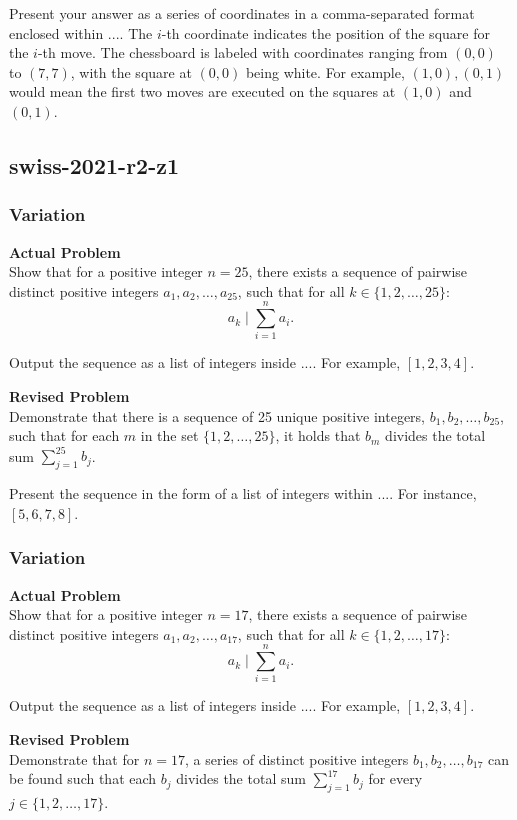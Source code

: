 Present your answer as a series of coordinates in a comma-separated format enclosed within $\boxed{...}$. The $i$-th coordinate indicates the position of the square for the $i$-th move. The chessboard is labeled with coordinates ranging from $(0,0)$ to $(7,7)$, with the square at $(0,0)$ being white. For example, $\boxed{(1,0),(0,1)}$ would mean the first two moves are executed on the squares at $(1,0)$ and $(0,1)$.

\subsection{swiss-2021-r2-z1}
\subsubsection{Variation}
\textbf{Actual Problem}\\
Show that for a positive integer $n=25$, there exists a sequence of pairwise distinct positive integers $a_1, a_2, \ldots, a_{25}$, such that for all $k \in \{1,2,\ldots,25\}$: $$a_k \mid \sum_{i=1}^{n} a_i.$$

Output the sequence as a list of integers inside $\boxed{...}$. For example, $\boxed{[1,2,3,4]}$.

\textbf{Revised Problem}\\
Demonstrate that there is a sequence of 25 unique positive integers, $b_1, b_2, \ldots, b_{25}$, such that for each $m$ in the set $\{1, 2, \ldots, 25\}$, it holds that $b_m$ divides the total sum $\sum_{j=1}^{25} b_j$.

Present the sequence in the form of a list of integers within $\boxed{...}$. For instance, $\boxed{[5,6,7,8]}$.

\subsubsection{Variation}
\textbf{Actual Problem}\\
Show that for a positive integer $n=17$, there exists a sequence of pairwise distinct positive integers $a_1, a_2, \ldots, a_{17}$, such that for all $k \in \{1,2,\ldots,17\}$: $$a_k \mid \sum_{i=1}^{n} a_i.$$

Output the sequence as a list of integers inside $\boxed{...}$. For example, $\boxed{[1,2,3,4]}$.

\textbf{Revised Problem}\\
Demonstrate that for $n=17$, a series of distinct positive integers $b_1, b_2, \ldots, b_{17}$ can be found such that each $b_j$ divides the total sum $\sum_{j=1}^{17} b_j$ for every $j \in \{1, 2, \ldots, 17\}$.

